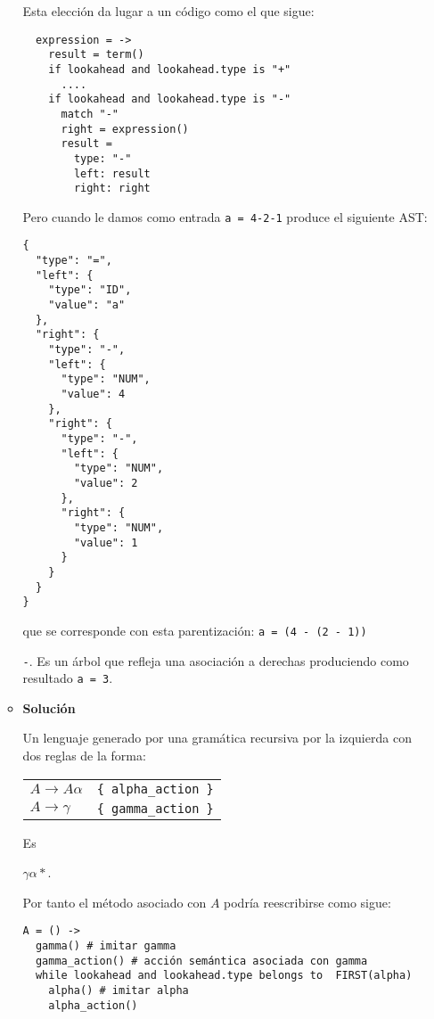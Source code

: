 \begin{itemize}
\begin{itemize}
Esta elección da lugar a un código como el que sigue:
\begin{verbatim}
  expression = ->
    result = term()
    if lookahead and lookahead.type is "+"
      ....
    if lookahead and lookahead.type is "-" 
      match "-" 
      right = expression()
      result =
        type: "-" 
        left: result
        right: right
\end{verbatim}
Pero cuando le damos como entrada \verb|a = 4-2-1| produce el siguiente AST:
\begin{verbatim}
{
  "type": "=",
  "left": {
    "type": "ID",
    "value": "a"
  },
  "right": {
    "type": "-",
    "left": {
      "type": "NUM",
      "value": 4
    },
    "right": {
      "type": "-",
      "left": {
        "type": "NUM",
        "value": 2
      },
      "right": {
        "type": "NUM",
        "value": 1
      }
    }
  }
}
\end{verbatim}
que se corresponde con esta parentización: \verb|a = (4 - (2 - 1))|

\verb|-|. Es un árbol que refleja una asociación a derechas produciendo 
como resultado \verb|a = 3|.


\item
{\bf Solución}


Un lenguaje generado por una gramática recursiva por la izquierda 
con dos reglas de la forma:
\vspace{0.25cm}
\begin{center}
\begin{tabular}{ll}
$A   \rightarrow A \alpha$  & \verb|{ alpha_action }|\\
$A   \rightarrow \gamma$    & \verb|{ gamma_action }|
\end{tabular}
\end{center}
Es 

\begin{center}
$\gamma \alpha *$.
\end{center}
\vspace{0.25cm}
Por tanto el método asociado con $A$ podría reescribirse como sigue:
\begin{verbatim}
A = () -> 
  gamma() # imitar gamma
  gamma_action() # acción semántica asociada con gamma
  while lookahead and lookahead.type belongs to  FIRST(alpha)
    alpha() # imitar alpha
    alpha_action()
\end{verbatim}


\end{itemize}
\end{itemize}
